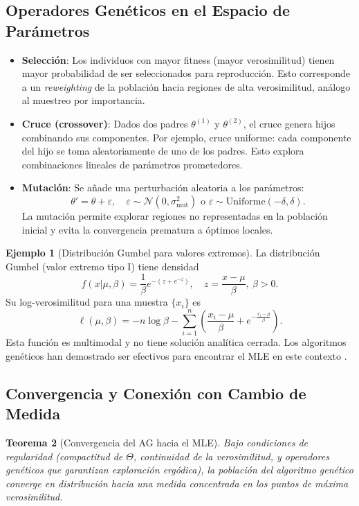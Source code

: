 \documentclass[11pt,a4paper]{article}
\theoremstyle{plain}
\newtheorem{theorem}{Teorema}[section]
\theoremstyle{definition}
\newtheorem{example}[theorem]{Ejemplo}
\theoremstyle{remark}
\newcommand{\1}{\mathbf{1}}
\begin{document}
\subsection{Operadores Genéticos en el Espacio de Parámetros}

\begin{itemize}
\item \textbf{Selección}: Los individuos con mayor fitness (mayor verosimilitud) tienen mayor probabilidad de ser seleccionados para reproducción. Esto corresponde a un \emph{reweighting} de la población hacia regiones de alta verosimilitud, análogo al muestreo por importancia.

\item \textbf{Cruce (crossover)}: Dados dos padres $\theta^{(1)}$ y $\theta^{(2)}$, el cruce genera hijos combinando sus componentes. Por ejemplo, cruce uniforme: cada componente del hijo se toma aleatoriamente de uno de los padres. Esto explora combinaciones lineales de parámetros prometedores.

\item \textbf{Mutación}: Se añade una perturbación aleatoria a los parámetros:
\[
\theta' = \theta + \varepsilon, \quad \varepsilon \sim \mathcal{N}(0,\sigma_{\text{mut}}^2) \text{ o } \varepsilon \sim \text{Uniforme}(-\delta,\delta).
\]
La mutación permite explorar regiones no representadas en la población inicial y evita la convergencia prematura a óptimos locales.
\end{itemize}

\begin{example}[Distribución Gumbel para valores extremos]
\label{ex:gumbel}
La distribución Gumbel (valor extremo tipo I) tiene densidad
\[
f(x|\mu,\beta) = \frac{1}{\beta} e^{-(z + e^{-z})}, \quad z = \frac{x-\mu}{\beta}, \ \beta > 0.
\]
Su log-verosimilitud para una muestra $\{x_i\}$ es
\[
\ell(\mu,\beta) = -n\log\beta - \sum_{i=1}^n \left(\frac{x_i-\mu}{\beta} + e^{-\frac{x_i-\mu}{\beta}}\right).
\]
Esta función es multimodal y no tiene solución analítica cerrada. Los algoritmos genéticos han demostrado ser efectivos para encontrar el MLE en este contexto \cite{fuentes2015maximizacion}.
\end{example}

\subsection{Convergencia y Conexión con Cambio de Medida}

\begin{theorem}[Convergencia del AG hacia el MLE]
Bajo condiciones de regularidad (compactitud de $\Theta$, continuidad de la verosimilitud, y operadores genéticos que garantizan exploración ergódica), la población del algoritmo genético converge en distribución hacia una medida concentrada en los puntos de máxima verosimilitud.
\end{theorem}
\end{document}
